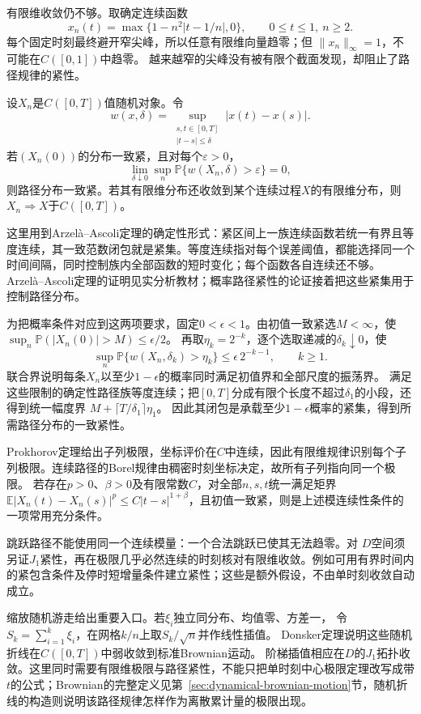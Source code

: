 有限维收敛仍不够。取确定连续函数
\[
x_n(t)=\max\{1-n^2|t-1/n|,0\},\qquad 0\leq t\leq1,\ n\geq2.
\]
每个固定时刻最终避开窄尖峰，所以任意有限维向量趋零；但
\(\|x_n\|_\infty=1\)，不可能在\(C([0,1])\)中趋零。
越来越窄的尖峰没有被有限个截面发现，却阻止了路径规律的紧性。

\begin{theorem}[连续路径的紧性与极限识别]
\label{thm:rv-continuous-path-tightness}
设\(X_n\)是\(C([0,T])\)值随机对象。令
\[
w(x,\delta)=\sup_{\substack{s,t\in[0,T]\\|t-s|\leq\delta}}|x(t)-x(s)|.
\]
若\((X_n(0))\)的分布一致紧，且对每个\(\varepsilon>0\)，
\[
\lim_{\delta\downarrow0}\sup_n
\mathbb P\{w(X_n,\delta)>\varepsilon\}=0,
\]
则路径分布一致紧。若其有限维分布还收敛到某个连续过程\(X\)的有限维分布，则
\(X_n\Rightarrow X\)于\(C([0,T])\)。
\end{theorem}
这里用到Arzelà--Ascoli定理的确定性形式：紧区间上一族连续函数若统一有界且等度连续，其一致范数闭包就是紧集。等度连续指对每个误差阈值，都能选择同一个时间间隔，同时控制族内全部函数的短时变化；每个函数各自连续还不够。Arzelà--Ascoli定理的证明见实分析教材；概率路径紧性的论证接着把这些紧集用于控制路径分布。

为把概率条件对应到这两项要求，固定\(0<\epsilon<1\)。由初值一致紧选\(M<\infty\)，使
\(\sup_n\mathbb P(|X_n(0)|>M)\leq\epsilon/2\)。
再取\(\eta_k=2^{-k}\)，逐个选取递减的\(\delta_k\downarrow0\)，使
\[
 \sup_n\mathbb P\{w(X_n,\delta_k)>\eta_k\}
 \leq\epsilon\,2^{-k-1},\qquad k\geq1.
\]
联合界说明每条\(X_n\)以至少\(1-\epsilon\)的概率同时满足初值界和全部尺度的振荡界。
满足这些限制的确定性路径族等度连续；把\([0,T]\)分成有限个长度不超过\(\delta_1\)的小段，还得到统一幅度界
\(M+\lceil T/\delta_1\rceil\eta_1\)。
因此其闭包是承载至少\(1-\epsilon\)概率的紧集，得到所需路径分布的一致紧性。

Prokhorov定理给出子列极限，坐标评价在\(C\)中连续，因此有限维规律识别每个子列极限。连续路径的Borel规律由稠密时刻坐标决定，故所有子列指向同一个极限。
若存在\(p>0\)、\(\beta>0\)及有限常数\(C\)，对全部\(n,s,t\)统一满足矩界
\(\mathbb E|X_n(t)-X_n(s)|^p\leq C|t-s|^{1+\beta}\)，且初值一致紧，则是上述模连续性条件的一项常用充分条件。

跳跃路径不能使用同一个连续模量：一个合法跳跃已使其无法趋零。对
\(D\)空间须另证\(J_1\)紧性，再在极限几乎必然连续的时刻核对有限维收敛。例如可用有界时间内的紧包含条件及停时短增量条件建立紧性；这些是额外假设，不由单时刻收敛自动成立。

缩放随机游走给出重要入口。若\(\xi_i\)独立同分布、均值零、方差一，
令\(S_k=\sum_{i=1}^k\xi_i\)，在网格\(k/n\)上取\(S_k/\sqrt n\)并作线性插值。
Donsker定理说明这些随机折线在\(C([0,T])\)中弱收敛到标准Brownian运动。
阶梯插值相应在\(D\)的\(J_1\)拓扑收敛。这里同时需要有限维极限与路径紧性，不能只把单时刻中心极限定理改写成带\(t\)的公式；Brownian的完整定义见第~\ref{sec:dynamical-brownian-motion}节，随机折线的构造则说明该路径规律怎样作为离散累计量的极限出现。


